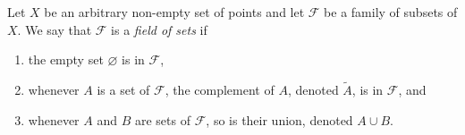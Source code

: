 Let $X$ be an arbitrary non-empty set of points and let $\mathcal{F}$ be a family of subsets of $X$. We say that $\mathcal{F}$ is a \textit{field of sets} if
\begin{enumerate}
\item[(1)] the empty set $\varnothing$ is in $\mathcal{F}$,
\item[(2)] whenever $A$ is a set of $\mathcal{F}$, the complement of $A$, denoted $\tilde{A}$, is in $\mathcal{F}$, and
\item[(3)] whenever $A$ and $B$ are sets of $\mathcal{F}$, so is their union, denoted $A \cup B$.
\end{enumerate}
